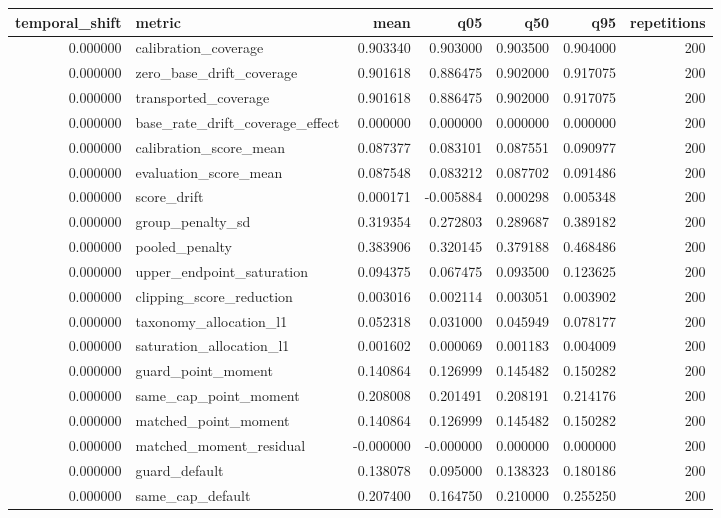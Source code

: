 \begin{tabular}{rlrrrrr}
\toprule
temporal\_shift & metric & mean & q05 & q50 & q95 & repetitions \\
\midrule
0.000000 & calibration\_coverage & 0.903340 & 0.903000 & 0.903500 & 0.904000 & 200 \\
0.000000 & zero\_base\_drift\_coverage & 0.901618 & 0.886475 & 0.902000 & 0.917075 & 200 \\
0.000000 & transported\_coverage & 0.901618 & 0.886475 & 0.902000 & 0.917075 & 200 \\
0.000000 & base\_rate\_drift\_coverage\_effect & 0.000000 & 0.000000 & 0.000000 & 0.000000 & 200 \\
0.000000 & calibration\_score\_mean & 0.087377 & 0.083101 & 0.087551 & 0.090977 & 200 \\
0.000000 & evaluation\_score\_mean & 0.087548 & 0.083212 & 0.087702 & 0.091486 & 200 \\
0.000000 & score\_drift & 0.000171 & -0.005884 & 0.000298 & 0.005348 & 200 \\
0.000000 & group\_penalty\_sd & 0.319354 & 0.272803 & 0.289687 & 0.389182 & 200 \\
0.000000 & pooled\_penalty & 0.383906 & 0.320145 & 0.379188 & 0.468486 & 200 \\
0.000000 & upper\_endpoint\_saturation & 0.094375 & 0.067475 & 0.093500 & 0.123625 & 200 \\
0.000000 & clipping\_score\_reduction & 0.003016 & 0.002114 & 0.003051 & 0.003902 & 200 \\
0.000000 & taxonomy\_allocation\_l1 & 0.052318 & 0.031000 & 0.045949 & 0.078177 & 200 \\
0.000000 & saturation\_allocation\_l1 & 0.001602 & 0.000069 & 0.001183 & 0.004009 & 200 \\
0.000000 & guard\_point\_moment & 0.140864 & 0.126999 & 0.145482 & 0.150282 & 200 \\
0.000000 & same\_cap\_point\_moment & 0.208008 & 0.201491 & 0.208191 & 0.214176 & 200 \\
0.000000 & matched\_point\_moment & 0.140864 & 0.126999 & 0.145482 & 0.150282 & 200 \\
0.000000 & matched\_moment\_residual & -0.000000 & -0.000000 & 0.000000 & 0.000000 & 200 \\
0.000000 & guard\_default & 0.138078 & 0.095000 & 0.138323 & 0.180186 & 200 \\
0.000000 & same\_cap\_default & 0.207400 & 0.164750 & 0.210000 & 0.255250 & 200 \\

\end{tabular}
